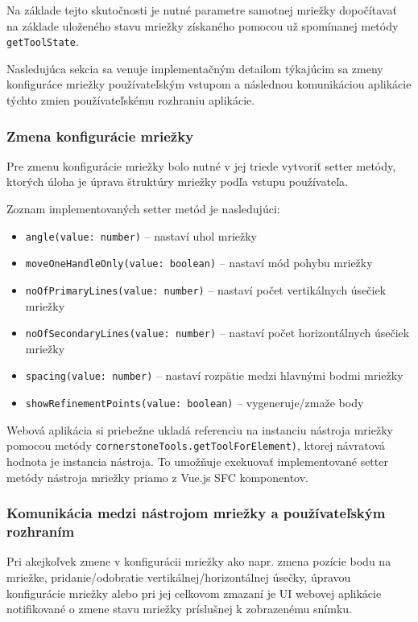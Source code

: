 Na základe tejto skutočnosti je nutné parametre samotnej mriežky dopočítavať na základe uloženého stavu mriežky získaného pomocou už spomínanej metódy \texttt{getToolState}.

Nasledujúca sekcia sa venuje implementačným detailom týkajúcim sa zmeny konfiguráce mriežky používateľským vstupom a následnou komunikáciou aplikácie týchto zmien používateľskému rozhraniu aplikácie.

\subsubsection {Zmena konfigurácie mriežky}
Pre zmenu konfigurácie mriežky bolo nutné v jej triede vytvoriť setter metódy, ktorých úloha je úprava štruktúry mriežky podľa vstupu používateľa.

Zoznam implementovaných setter metód je nasledujúci:
\begin {itemize}
\item {\texttt{angle(value: number)} -- nastaví uhol mriežky}
\item {\texttt{moveOneHandleOnly(value: boolean)} -- nastaví mód pohybu mriežky}
\item {\texttt{noOfPrimaryLines(value: number)} -- nastaví počet vertikálnych úsečiek mriežky}
\item {\texttt{noOfSecondaryLines(value: number)} -- nastaví počet horizontálnych úsečiek mriežky}
\item {\texttt{spacing(value: number)} -- nastaví rozpätie medzi hlavnými bodmi mriežky}
\item {\texttt{showRefinementPoints(value: boolean)} -- vygeneruje/zmaže  body}
\end {itemize}

\clearpage

Webová aplikácia si priebežne ukladá referenciu na instanciu nástroja mriežky pomocou metódy \texttt{cornerstoneTools.getToolForElement)}, ktorej návratová hodnota je instancia nástroja. To umožňuje exekuovať implementované setter metódy nástroja mriežky priamo z Vue.js SFC komponentov.

\subsubsection {Komunikácia medzi nástrojom mriežky a používateľským rozhraním}
Pri akejkoľvek zmene v konfigurácii mriežky ako napr. zmena pozície bodu na mriežke, pridanie/odobratie vertikálnej/horizontálnej úsečky, úpravou konfigurácie mriežky alebo pri jej celkovom zmazaní je UI webovej aplikácie notifikované o zmene stavu mriežky príslušnej k zobrazenému snímku.

